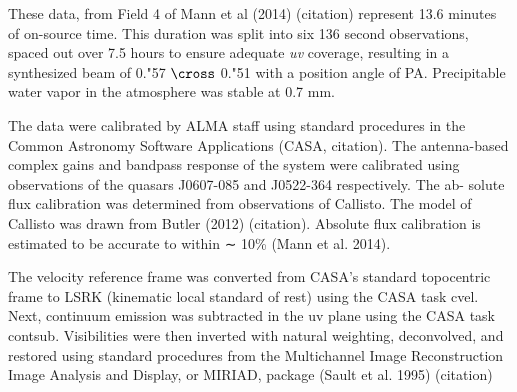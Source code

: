 These data, from Field 4 of Mann et al (2014) (citation) represent 13.6 minutes of on-source time. This duration was split into six 136 second observations, spaced out over 7.5 hours to ensure adequate \textit{uv} coverage, resulting in a synthesized beam of 0."57 $\cross$ 0."51 with a position angle of PA. Precipitable water vapor in the atmosphere was stable at 0.7 mm.




The data were calibrated by ALMA staff using standard procedures in the Common Astronomy Software Applications (CASA, citation). The antenna-based complex gains and bandpass response of the system were calibrated using observations of the quasars J0607-085 and J0522-364 respectively. The ab- solute flux calibration was determined from observations of Callisto. The model of Callisto was drawn from Butler (2012) (citation). Absolute flux calibration is estimated to be accurate to within ∼ 10\% (Mann et al. 2014).

The velocity reference frame was converted from CASA's standard topocentric frame to LSRK (kinematic local standard of rest) using the CASA task cvel. Next, continuum emission was subtracted in the uv plane using the CASA task contsub. Visibilities were then inverted with natural weighting, deconvolved, and restored using standard procedures from the Multichannel Image Reconstruction Image Analysis and Display, or MIRIAD, package (Sault et al. 1995) (citation)








\iffalse
Things to get:
* noise profiles as func of baseline
* Noise levels
* Beam size, max angular scales after baseline cuts (how to get that?)
* Beam position angle
* Does ICR use natural weighting? (using robust=2)
\fi
